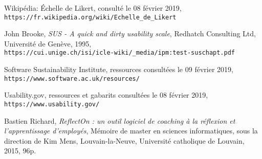 \documentclass[a4paper, 11pt]{article}
\begin{document}
\newpage

\begin{thebibliography}{9}
    Wikipédia: \'Echelle de Likert, consulté le 08 février 2019,
    \\\texttt{https://fr.wikipedia.org/wiki/Echelle\_de\_Likert}

    John Brooke, \emph{SUS - A quick and dirty usability scale}, Redhatch Consulting Ltd, Université de Genève, 1995,
    \\\texttt{https://cui.unige.ch/isi/icle-wiki/\_media/ipm:test-suschapt.pdf}

    Software Sustainability Institute, ressources consultées le 09 février 2019,
    \\\texttt{https://www.software.ac.uk/resources/}

    Usability.gov, ressources et gabarits consultées le 08 février 2019,
    \\\texttt{https://www.usability.gov/}

    Bastien Richard, \textit{ReflectOn : un outil logiciel de coaching à la réflexion et l'apprentissage d'employés}, Mémoire de master en sciences informatiques, sous la direction de Kim Mens, Louvain-la-Neuve, Université catholique de Louvain, 2015, 96p.

\end{thebibliography}
\end{document}
